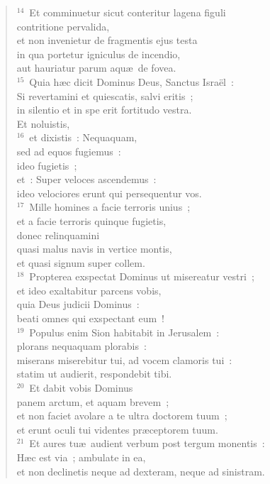 \begin{flushleft}
\begin{verse}
${}^{14}$~Et comminuetur sicut conteritur lagena figuli\\ contritione pervalida,\\ et non invenietur de fragmentis ejus testa\\ in qua portetur igniculus de incendio,\\ aut hauriatur parum aqu\ae\ de fovea.\\
${}^{15}$~Quia h\ae c dicit Dominus Deus, Sanctus Isra\"el~:\\ Si revertamini et quiescatis, salvi eritis~;\\ in silentio et in spe erit fortitudo vestra.\\ Et noluistis,\\
${}^{16}$~et dixistis~: Nequaquam,\\ sed ad equos fugiemus~:\\ ideo fugietis~;\\ et~: Super veloces ascendemus~:\\ ideo velociores erunt qui persequentur vos.\\
${}^{17}$~Mille homines a facie terroris unius~;\\ et a facie terroris quinque fugietis,\\ donec relinquamini\\ quasi malus navis in vertice montis,\\ et quasi signum super collem.\\
${}^{18}$~Propterea exspectat Dominus ut misereatur vestri~;\\ et ideo exaltabitur parcens vobis,\\ quia Deus judicii Dominus~:\\ beati omnes qui exspectant eum~!\\
${}^{19}$~Populus enim Sion habitabit in Jerusalem~:\\ plorans nequaquam plorabis~:\\ miserans miserebitur tui, ad vocem clamoris tui~:\\ statim ut audierit, respondebit tibi.\\
${}^{20}$~Et dabit vobis Dominus\\ panem arctum, et aquam brevem~;\\ et non faciet avolare a te ultra doctorem tuum~;\\ et erunt oculi tui videntes pr\ae ceptorem tuum.\\
${}^{21}$~Et aures tu\ae\ audient verbum post tergum monentis~:\\ H\ae c est via~; ambulate in ea,\\ et non declinetis neque ad dexteram, neque ad sinistram.\\

\end{verse}
\end{flushleft}

